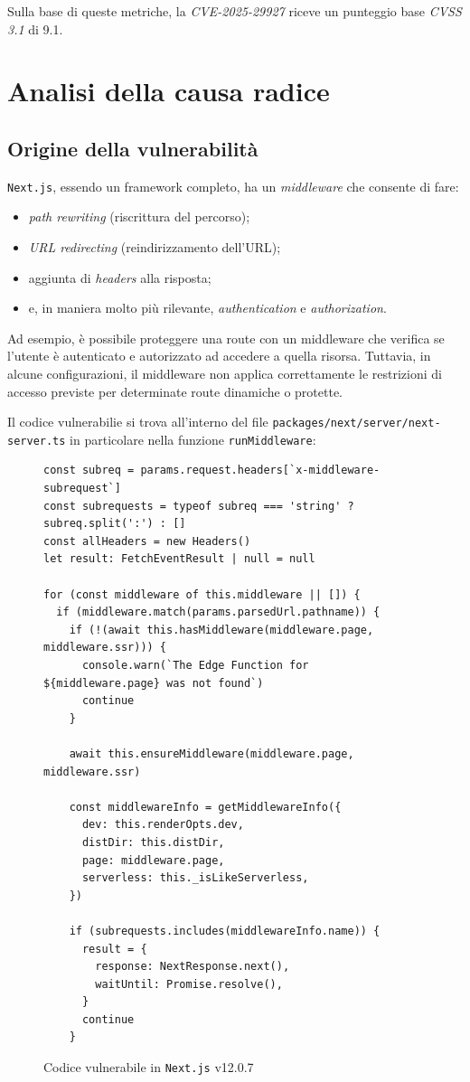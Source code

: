 \documentclass[a4paper,oneside,12pt]{report}
\begin{document}
Sulla base di queste metriche, la \emph{CVE-2025-29927} riceve un punteggio base \emph{CVSS 3.1} di 9.1.

\chapter{Analisi della causa radice}
\label{chap:analisi-causa-radice}

\section{Origine della vulnerabilit\`a}
\label{sec:origine-vulnerabilita}

\texttt{Next.js}, essendo un framework completo, ha un \emph{middleware} che consente di fare:
\begin{itemize}
	\item \textit{path rewriting} (riscrittura del percorso);
	\item \textit{URL redirecting} (reindirizzamento dell'URL);
	\item aggiunta di \textit{headers} alla risposta;
	\item e, in maniera molto pi\`u rilevante, \textit{authentication} e \textit{authorization}.
\end{itemize}
Ad esempio, \`e possibile proteggere una route con un middleware che verifica se l'utente \`e autenticato e autorizzato ad accedere a quella risorsa. Tuttavia, in alcune configurazioni, il middleware non applica correttamente le restrizioni di accesso previste per determinate route dinamiche o protette.

Il codice vulnerabilie si trova all'interno del file \texttt{packages/next/server/next-server.ts} in particolare nella funzione \texttt{runMiddleware}:
\begin{figure}[H]
	\centering
\begin{verbatim}
const subreq = params.request.headers[`x-middleware-subrequest`]
const subrequests = typeof subreq === 'string' ? subreq.split(':') : []
const allHeaders = new Headers()
let result: FetchEventResult | null = null

for (const middleware of this.middleware || []) {
  if (middleware.match(params.parsedUrl.pathname)) {
    if (!(await this.hasMiddleware(middleware.page, middleware.ssr))) {
      console.warn(`The Edge Function for ${middleware.page} was not found`)
      continue
    }

    await this.ensureMiddleware(middleware.page, middleware.ssr)

    const middlewareInfo = getMiddlewareInfo({
      dev: this.renderOpts.dev,
      distDir: this.distDir,
      page: middleware.page,
      serverless: this._isLikeServerless,
    })

    if (subrequests.includes(middlewareInfo.name)) {
      result = {
        response: NextResponse.next(),
        waitUntil: Promise.resolve(),
      }
      continue
    }
\end{verbatim}
	\caption{Codice vulnerabile in \texttt{Next.js} v12.0.7}
	\label{fig:nextjs-vulnerable-code-v12.0.7}
\end{figure}
\end{document}
